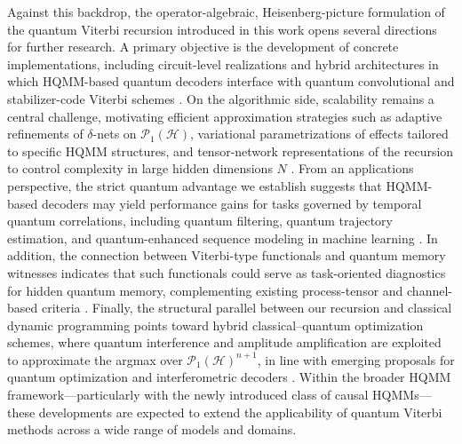 \documentclass[12pt, reco]{article}
\begin{document}
Against this backdrop, the operator-algebraic, Heisenberg-picture formulation of the quantum Viterbi recursion introduced in this work opens several directions for further research. A primary objective is the development of concrete implementations, including circuit-level realizations and hybrid architectures in which HQMM-based quantum decoders interface with quantum convolutional and stabilizer-code Viterbi schemes \cite{OllivierTillich2006,TanLi2010,GriceMeyer2015}. On the algorithmic side, scalability remains a central challenge, motivating efficient approximation strategies such as adaptive refinements of $\delta$-nets on $\mathcal{P}_1(\mathcal{H})$, variational parametrizations of effects tailored to specific HQMM structures, and tensor-network representations of the recursion to control complexity in large hidden dimensions $N$ \cite{GT25,Sou25}. From an applications perspective, the strict quantum advantage we establish suggests that HQMM-based decoders may yield performance gains for tasks governed by temporal quantum correlations, including quantum filtering, quantum trajectory estimation, and quantum-enhanced sequence modeling in machine learning \cite{ticozzi2008,HY2018,SSP15,J22}. In addition, the connection between Viterbi-type functionals and quantum memory witnesses indicates that such functionals could serve as task-oriented diagnostics for hidden quantum memory, complementing existing process-tensor and channel-based criteria \cite{TaElM,OZNPQ26}. Finally, the structural parallel between our recursion and classical dynamic programming points toward hybrid classical–quantum optimization schemes, where quantum interference and amplitude amplification are exploited to approximate the argmax over $\mathcal{P}_1(\mathcal{H})^{n+1}$, in line with emerging proposals for quantum optimization and interferometric decoders \cite{Ambainis2003,JSW2025,SCFFK25}. Within the broader HQMM framework—particularly with the newly introduced class of causal HQMMs—these developments are expected to extend the applicability of quantum Viterbi methods across a wide range of models and domains.
\end{document}
